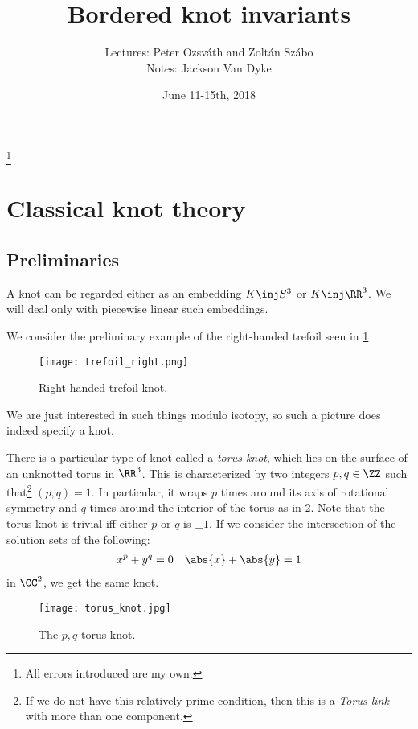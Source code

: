 \documentclass{amsproc}
\begin{document}
\author{Lectures: Peter Ozsv\'ath and Zolt\'an Sz\'abo \\
Notes: Jackson Van Dyke}
\thanks{All errors introduced are my own.}
\date{June 11-15th, 2018}
\title{Bordered knot invariants}
\maketitle
\tableofcontents

\section{Classical knot theory}

\subsection{Preliminaries}

A knot can be regarded either as an embedding $K\inj S^3$
or $K\inj \RR^3$.
We will deal only with piecewise linear such embeddings.

\begin{exm}
We consider the preliminary example of the right-handed trefoil seen in \cref{fig:right_trefoil}
\begin{figure}
\texttt{[image: trefoil\_right.png]}
\caption{Right-handed trefoil knot.}
\label{fig:right_trefoil}
\end{figure}
\end{exm}

We are just interested in such things modulo isotopy, so such a picture 
does indeed specify a knot.

There is a particular type of knot called a \emph{torus knot},
which lies on the surface of an unknotted torus in $\RR^3$. 
This is characterized by two integers $p,q\in \ZZ$ such that\footnote{
If we do not have this relatively prime condition, then this is a \emph{Torus link}
with more than one component.} $\left( p,q \right) = 1$.
In particular, it wraps $p$ times around
its axis of rotational symmetry and $q$ times around the interior of the torus as in 
\cref{fig:torus_knot}.
Note that the torus knot is trivial iff either $p$ or $q$ is $\pm 1$.
If we consider the intersection of the solution sets of the following:
\begin{align}
x^p + y^q = 0
&&
\abs{x} + \abs{y} = 1
\end{align}
in $\CC^2$, we get the same knot.

\begin{figure}
\centering
\texttt{[image: torus\_knot.jpg]}
\caption{The $p,q$-torus knot.}
\label{fig:torus_knot}
\end{figure}
\end{document}
